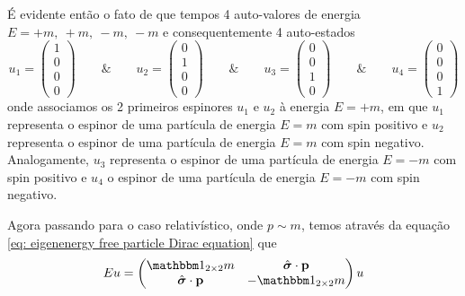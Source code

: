     É evidente então o fato de que tempos 4 auto-valores de energia $E = +m,\ +m,\ -m,\ -m$ e consequentemente 4 auto-estados
        \begin{equation*}
            u_{1} = \begin{pmatrix}
                1 \\ 0 \\ 0 \\ 0
            \end{pmatrix} \qquad \& \qquad 
            u_{2} = \begin{pmatrix}
                0 \\ 1 \\ 0 \\ 0
            \end{pmatrix} \qquad \& \qquad 
            u_{3} = \begin{pmatrix}
                0 \\ 0 \\ 1 \\ 0
            \end{pmatrix} \qquad \& \qquad 
            u_{4} = \begin{pmatrix}
                0 \\ 0 \\ 0 \\ 1
            \end{pmatrix}
        \end{equation*}
    onde associamos os 2 primeiros espinores $u_{1}$ e $u_{2}$ à energia $E = +m$, em que $u_{1}$ representa o espinor de uma partícula de energia $E = m$ com spin positivo e $u_{2}$ representa o espinor de uma partícula de energia $E = m$ com spin negativo. Analogamente, $u_{3}$ representa o espinor de uma partícula de energia $E = -m$ com spin positivo e $u_{4}$ o espinor de uma partícula de energia $E = -m$ com spin negativo.

    Agora passando para o caso relativístico, onde $p \sim m$, temos através da equação \eqref{eq: eigenenergy free particle Dirac equation} que
        \begin{equation*}
            Eu = \begin{pmatrix}
                \boldone_{2\times 2}m & \hat{\boldsymbol{\sigma}}\cdot\vb{p} \\
                \hat{\boldsymbol{\sigma}}\cdot\vb{p} & -\boldone_{2\times 2}m
            \end{pmatrix}u
        \end{equation*}

